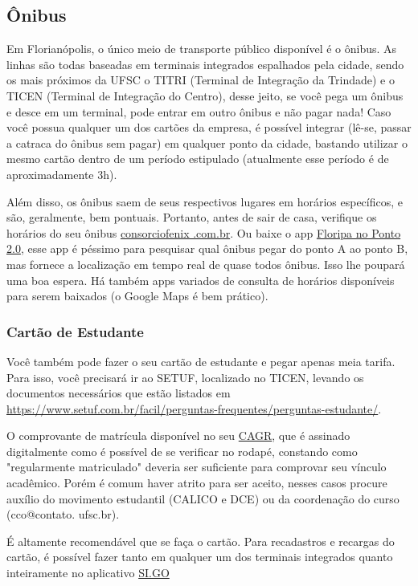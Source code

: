 \subsection{Ônibus}
Em Florianópolis, o único meio de transporte público disponível é o ônibus. As linhas são todas baseadas em terminais integrados espalhados pela cidade, sendo os mais próximos da UFSC o TITRI (Terminal de Integração da Trindade) e o TICEN (Terminal de Integração do Centro), desse jeito, se você pega um ônibus e desce em um terminal, pode entrar em outro ônibus e não pagar nada! Caso você possua qualquer um dos cartões da empresa, é possível integrar (lê-se, passar a catraca do ônibus sem pagar) em qualquer ponto da cidade, bastando utilizar o mesmo cartão dentro de um período estipulado (atualmente esse período é de aproximadamente 3h).

Além disso, os ônibus saem de seus respectivos lugares em horários específicos, e são, geralmente, bem pontuais.
Portanto, antes de sair de casa, verifique os horários do seu ônibus \href{consorciofenix.com.br}{consorciofenix .com.br}.
Ou baixe o app \href{https://play.google.com/store/search?q=floripa%20no%20ponto}{Floripa no Ponto 2.0}, esse app é péssimo para pesquisar qual ônibus pegar do ponto A ao ponto B, mas fornece a localização em tempo real de quase todos ônibus. Isso lhe poupará uma boa espera. Há também apps variados de consulta de horários disponíveis para serem baixados (o Google Maps é bem prático).

\subsubsection{Cartão de Estudante}

Você também pode fazer o seu cartão de estudante e pegar apenas meia tarifa.
Para isso, você precisará ir ao SETUF, localizado no TICEN, levando os documentos necessários que estão listados em \href{https://www.setuf.com.br/facil/perguntas-frequentes/perguntas-estudante/}{https://www.setuf.com.br/facil/perguntas-frequentes/perguntas-estudante/}.

O comprovante de matrícula disponível no seu \href{https://cagr.sistemas.ufsc.br/relatorios/aluno/atestadoMatricula?download}{CAGR},
que é assinado digitalmente como é possível de se verificar no rodapé, constando como "regularmente matriculado" deveria ser suficiente para comprovar seu vínculo acadêmico.
Porém é comum haver atrito para ser aceito, nesses casos procure auxílio do movimento estudantil (CALICO e DCE) ou da coordenação do curso (cco@contato. ufsc.br).

É altamente recomendável que se faça o cartão.
Para recadastros e recargas do cartão, é possível fazer tanto em qualquer um dos terminais integrados quanto inteiramente no aplicativo \href{https://play.google.com/store/apps/details?id=br.com.henkoti.empresa1.smpay}{SI.GO}

